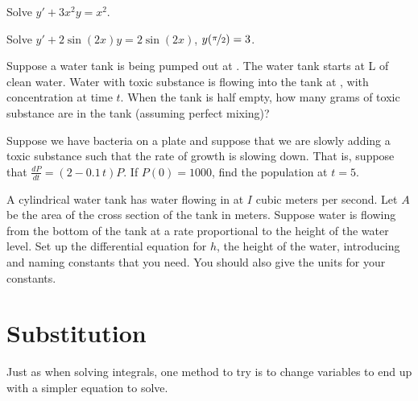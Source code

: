 \begin{exercise}
Solve $y'+3 x^2 y = x^2$.
\end{exercise}

\begin{exercise}
Solve $y'+ 2\sin(2x) y = 2\sin(2x)$, $y(\nicefrac{\pi}{2}) = 3$.
\end{exercise}

\begin{exercise}
Suppose a water tank is being pumped out at .  The
water tank starts at \unit[10]{L} of clean water.
Water with
toxic substance is flowing into the tank at ,
with concentration  at time $t$.
When the tank is half empty, how many grams of toxic substance are in the
tank (assuming perfect mixing)?
\end{exercise}

\begin{exercise}
Suppose we have bacteria on a plate and suppose that we are slowly adding
a toxic substance such that the rate of growth is slowing down.  That is,
suppose that $\frac{dP}{dt} = (2-0.1\,t)P$.  If $P(0) = 1000$, find
the population at $t=5$.
\end{exercise}

\begin{exercise}
A cylindrical water tank has water flowing in at $I$ cubic meters
per second.
Let $A$ be the area of the cross section of the tank in meters.
Suppose water is
flowing from the bottom of the tank at a rate proportional to the height of
the water level.  Set up the differential equation for $h$, the height of the
water, introducing and naming
constants that you need.  You should also give the units for your constants.
\end{exercise}


\sectionnewpage
\section{Substitution}
\label{substitution:section}

Just as when solving integrals, one method to try is to change variables to
end up with a simpler equation to solve.

